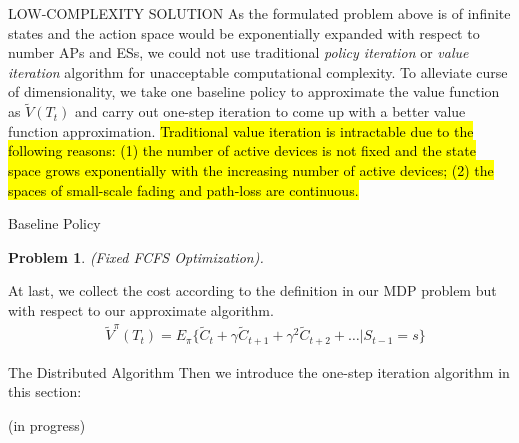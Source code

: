 \documentclass[10pt, conference, letterpaper]{IEEEtran}
\newtheorem{problem}{Problem}
\begin{document}
    \begin{section}{LOW-COMPLEXITY SOLUTION}
        \label{sec:algorithm}
        As the formulated problem above is of infinite states and the action space would be exponentially expanded with respect to number APs and ESs, we could not use traditional \emph{policy iteration} or \emph{value iteration} algorithm \cite{sutton1998introduction} for unacceptable computational complexity. To alleviate curse of dimensionality, we take one baseline policy to approximate the value function as $\tilde{V}(T_t)$ and carry out one-step iteration to come up with a better value function approximation.
        \hl{Traditional value iteration is intractable due to the following reasons: (1) the number of active devices is not fixed and the state space grows exponentially with the increasing number of active devices; (2) the spaces of small-scale fading and path-loss are continuous.}

        \begin{subsection}{Baseline Policy}
            \begin{problem}
                (Fixed FCFS Optimization).
            \end{problem}

            At last, we collect the cost according to the definition in our MDP problem but with respect to our approximate algorithm.
            \begin{align}
                & \tilde{V}^{\pi}(T_t)
                \nonumber%
                = E_{\pi} \{ \tilde{C}_{t} + \gamma \tilde{C}_{t+1} + \gamma^2 \tilde{C}_{t+2} + \dots |S_{t-1}=s \}
            \end{align}
        \end{subsection}

        \begin{subsection}{The Distributed Algorithm}
            Then we introduce the one-step iteration algorithm in this section:
            \begin{algorithm}[H]
                \caption{Distributed Algorithm for $k$-th AP}
                \begin{algorithmic}
                    \WHILE{\TRUE}
                        \STATE (in progress)
                    \ENDWHILE
                \end{algorithmic}
            \end{algorithm}
        \end{subsection}
        
    \end{section}
\end{document}
